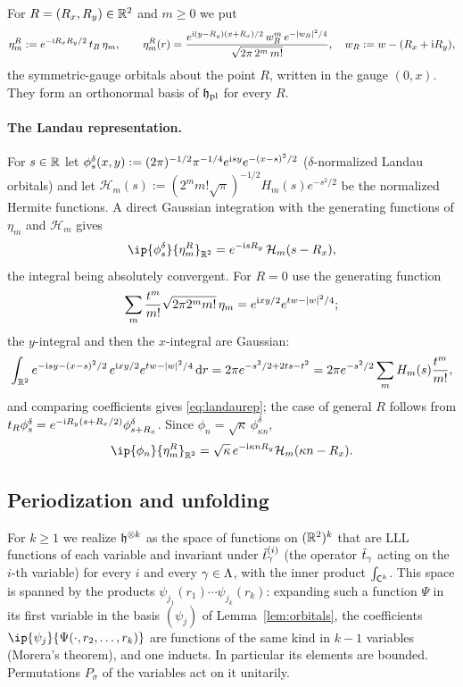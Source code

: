 For $R=(R_x,R_y)\in\mathbb{R}^2$ and $m\ge0$ we put
\begin{equation}\label{eq:etaR}
\eta_m^R:=e^{-\mathrm{i} R_xR_y/2}\,t_R\,\eta_m,\qquad
\eta_m^R(r)=\frac{e^{\mathrm{i}(y-R_y)(x+R_x)/2}\,w_R^m\,e^{-\lvert w_R\rvert^2/4}}{\sqrt{2\pi\,2^m\,m!}},\quad w_R:=w-(R_x+\mathrm{i} R_y),
\end{equation}
the symmetric-gauge orbitals about the point $R$, written in the gauge $(0,x)$. They form an orthonormal basis of
$\mathfrak{h}_{\mathrm{pl}}$ for every $R$.

\paragraph{The Landau representation.}
For $s\in\mathbb{R}$ let $\phi^\delta_s(x,y):=(2\pi)^{-1/2}\pi^{-1/4}e^{\mathrm{i} sy}e^{-(x-s)^2/2}$ ($\delta$-normalized Landau orbitals)
and let $\mathcal H_m(s):=(2^mm!\sqrt\pi)^{-1/2}H_m(s)e^{-s^2/2}$ be the normalized Hermite functions. A direct Gaussian integration with the generating functions of
$\eta_m$ and $\mathcal H_m$ gives
\begin{equation}\label{eq:landaurep}
\ip{\phi^\delta_s}{\eta_m^R}_{\R^2}=e^{-\iu sR_y}\,\mathcal H_m(s-R_x),
\end{equation}
the integral being absolutely convergent. For $R=0$ use the generating function
\[
\sum_m\frac{t^m}{m!}\sqrt{2\pi2^mm!}\,\eta_m=e^{\mathrm{i} xy/2}e^{tw-\lvert w\rvert^2/4};
\]
the $y$-integral and then the $x$-integral are Gaussian:
\[
\int_{\mathbb{R}^2}e^{-\mathrm{i} sy-(x-s)^2/2}\,e^{\mathrm{i} xy/2}e^{tw-\lvert w\rvert^2/4}\,\mathrm{d} r=2\pi e^{-s^2/2+2ts-t^2}
=2\pi e^{-s^2/2}\sum_mH_m(s)\frac{t^m}{m!},
\]
and comparing coefficients gives \eqref{eq:landaurep}; the case of general $R$ follows from
$t_R\phi^\delta_s=e^{-\mathrm{i} R_y(s+R_x/2)}\phi^\delta_{s+R_x}$. Since $\phi_n=\sqrt\kappa\,\phi^\delta_{\kappa n}$,
\[
\ip{\phi_n}{\eta_m^R}_{\R^2}=\sqrt\kappa\,e^{-\iu\kappa nR_y}\mathcal H_m(\kappa n-R_x).
\]

\subsection{Periodization and unfolding}

For $k\ge1$ we realize $\mathfrak{h}^{\otimes k}$ as the space of functions on $(\mathbb{R}^2)^k$ that are LLL functions of each
variable and invariant under $\tilde t^{(i)}_\gamma$ (the operator $\tilde t_\gamma$ acting on the $i$-th variable) for every
$i$ and every $\gamma\in\Lambda$, with the inner product $\int_{\mathsf{C}^k}$. This space is spanned by the products
$\psi_{j_1}(r_1)\cdots\psi_{j_k}(r_k)$: expanding such a function $\Psi$ in its first variable in the basis $(\psi_j)$ of
Lemma~\ref{lem:orbitals}, the coefficients $\ip{\psi_j}{\Psi(\cdot,r_2,\dots,r_k)}$ are functions of the same kind in $k-1$ variables
(Morera's theorem), and one inducts. In particular its elements are bounded. Permutations $P_\sigma$ of the
variables act on it unitarily.


